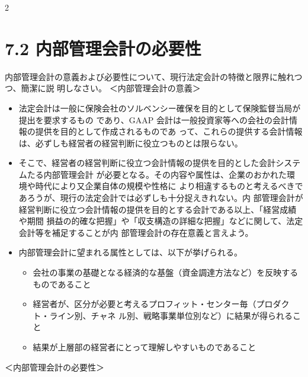 2\documentclass[report,gutter=10mm,fore-edge=10mm,uplatex,dvipdfmx]{jlreq}
\begin{document}
\section{7.2 内部管理会計の必要性}
内部管理会計の意義および必要性について、現行法定会計の特徴と限界に触れつつ、簡潔に説
明しなさい。
\answer{}
＜内部管理会計の意義＞
\begin{itemize}
 \item[] 法定会計は一般に保険会社のソルベンシー確保を目的として保険監督当局が提出を要求するもの
 であり、GAAP 会計は一般投資家等への会社の会計情報の提供を目的として作成されるものであ
 って、これらの提供する会計情報は、必ずしも経営者の経営判断に役立つものとは限らない。
 \item[] そこで、経営者の経営判断に役立つ会計情報の提供を目的とした会計システムたる内部管理会計
 が必要となる。その内容や属性は、企業のおかれた環境や時代により又企業自体の規模や性格に
 より相違するものと考えるべきであろうが、現行の法定会計では必ずしも十分捉えきれない。内
 部管理会計が経営判断に役立つ会計情報の提供を目的とする会計である以上、「経営成績や期間
 損益の的確な把握」や「収支構造の詳細な把握」などに関して、法定会計等を補足することが内
 部管理会計の存在意義と言えよう。
 \item[] 内部管理会計に望まれる属性としては、以下が挙げられる。
\begin{itemize}
  \item[] 会社の事業の基礎となる経済的な基盤（資金調達方法など）を反映するものであること
 \item[] 経営者が、区分が必要と考えるプロフィット・センター毎（プロダクト・ライン別、チャネ
 ル別、戦略事業単位別など）に結果が得られること
 \item[] 結果が上層部の経営者にとって理解しやすいものであること
\end{itemize}
\end{itemize}
＜内部管理会計の必要性＞
\end{document}
